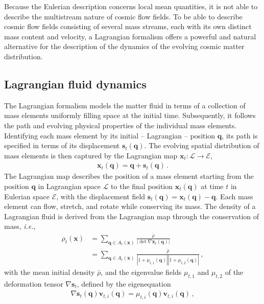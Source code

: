 \documentclass[a4paper, 11pt]{article}
\begin{document}
Because the Eulerian description concerns local mean quantities, it is not able to describe the multistream nature of cosmic flow fields. To be able to describe cosmic flow fields consisting of several mass streams, each with its own distinct mass content and velocity, a Lagrangian formalism offers a powerful and natural alternative for the description of the dynamics of the evolving cosmic matter distribution. 

\subsection{Lagrangian fluid dynamics}
The Lagrangian formalism models the matter fluid in terms of a collection of mass elements uniformly filling space at the initial time. Subsequently, it follows the path and evolving physical properties of the individual mass elements. Identifying each mass element by its initial -- Lagrangian -- position $\bm{q}$, its path is specified in terms of its displacement $\bm{s}_t(\bm{q})$. The evolving spatial distribution of mass elements is then captured by the Lagrangian map $\bm{x}_t:\mathcal{L}\to \mathcal{E}$,
\begin{align}
\bm{x}_t(\bm{q}) = \bm{q} + \bm{s}_t(\bm{q})\,.
\end{align}
The Lagrangian map describes the position of a mass element starting from the position $\bm{q}$ in Lagrangian space $\mathcal{L}$ to the final position $\bm{x}_t(\bm{q})$ at time $t$ in Eulerian space $\mathcal{E}$, with the displacement field $\bm{s}_t(\bm{q})= \bm{x}_t(\bm{q}) - \bm{q}$. Each mass element can flow, stretch, and rotate while conserving its mass. The density of a Lagrangian fluid is derived from the Lagrangian map through the conservation of mass, \textit{i.e.},
\begin{align}
\rho_t(\bm{x})
&= \sum_{\bm{q} \in A_t(\bm{x})} \frac{\bar{\rho}}{|\det \nabla \bm{x}_t(\bm{q})|}\nonumber\\
&= \sum_{\bm{q} \in A_t(\bm{x})} \frac{\bar{\rho}}{|1+\mu_{t,1}(\bm{q})||1+\mu_{t,2}(\bm{q})|}\,,
\label{eq:density}
\end{align}
with the mean initial density $\bar{\rho}$, and the eigenvalue fields $\mu_{t,1}$ and $\mu_{t,2}$ of the deformation tensor $\nabla \bm{s}_t$, defined by the eigenequation
\begin{align}
\nabla \bm{s}_t(\bm{q}) \bm{v}_{t,i}(\bm{q}) = \mu_{t,i}(\bm{q}) \bm{v}_{t,i}(\bm{q})\,,
\label{eq:EigenvalueAndEigenvector}
\end{align} 
\end{document}
